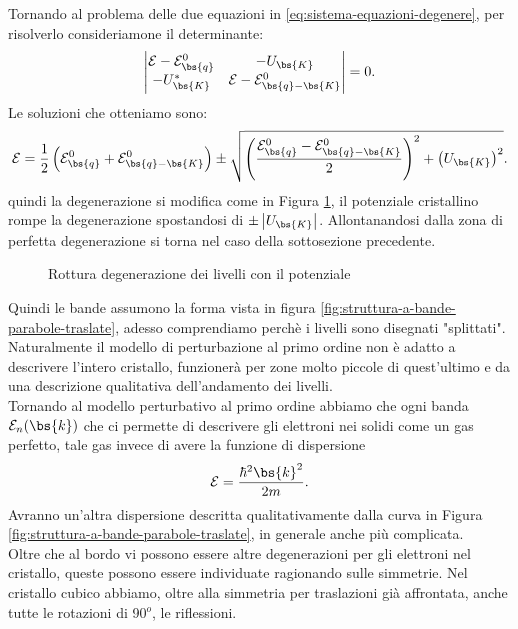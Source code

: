 Tornando al problema delle due equazioni in \ref{eq:sistema-equazioni-degenere}, per risolverlo consideriamone il determinante:
\[
	\begin{vmatrix}
		\mathcal{E}-\mathcal{E}^0_{\bs{q}} & -U_{\bs{K}} \\
		-U_{\bs{K}}^* & \mathcal{E}-\mathcal{E}^0_{\bs{q}-\bs{K}}
	\end{vmatrix} 
	=
	0
.\] 
Le soluzioni che otteniamo sono:
\[\begin{aligned}
	\mathcal{E}  = \frac{1}{2}\left( \mathcal{E}^0_{\bs{q}} 
		+ 
	\mathcal{E}^0_{\bs{q}-\bs{K}} \right) 
	\pm
	\sqrt{\left( 
	\frac{\mathcal{E}^0_{\bs{q}}-\mathcal{E}^0_{\bs{q}-\bs{K}}}{2} \right) ^2
		+ 
	\left( U_{\bs{K}} \right)^2} 
.\end{aligned}\]
quindi la degenerazione si modifica come in Figura  \ref{fig:rottura-degenerazione-dei-livelli-con-il-potenziale}, il potenziale cristallino rompe la degenerazione spostandosi di $ \pm \left| U_{\bs{K}} \right|$. Allontanandosi dalla zona di perfetta degenerazione si torna nel caso della sottosezione precedente.
\begin{figure}[ht]
    \centering
    \caption{Rottura degenerazione dei livelli con il potenziale}
    \label{fig:rottura-degenerazione-dei-livelli-con-il-potenziale}
\end{figure}
Quindi le bande assumono la forma vista in figura \ref{fig:struttura-a-bande-parabole-traslate}, adesso comprendiamo perchè i livelli sono disegnati "splittati".\\
Naturalmente il modello di perturbazione al primo ordine non è adatto a descrivere l'intero cristallo, funzionerà per zone molto piccole di quest'ultimo e da una descrizione qualitativa dell'andamento dei livelli.\\
Tornando al modello perturbativo al primo ordine abbiamo che ogni banda $\mathcal{E}_n(\bs{k})$ che ci permette di descrivere gli elettroni nei solidi come un gas perfetto, tale gas invece di avere la funzione di dispersione 
\[
	\mathcal{E}  = \frac{\hbar ^2 \bs{k}^2}{2m}
.\] 
Avranno un'altra dispersione descritta qualitativamente dalla curva in Figura \ref{fig:struttura-a-bande-parabole-traslate}, in generale anche più complicata. \\
Oltre che al bordo vi possono essere altre degenerazioni per gli elettroni nel cristallo, queste possono essere individuate ragionando sulle simmetrie. Nel cristallo cubico abbiamo, oltre alla simmetria per traslazioni già affrontata, anche tutte le rotazioni di 90$^o$, le riflessioni. \\
